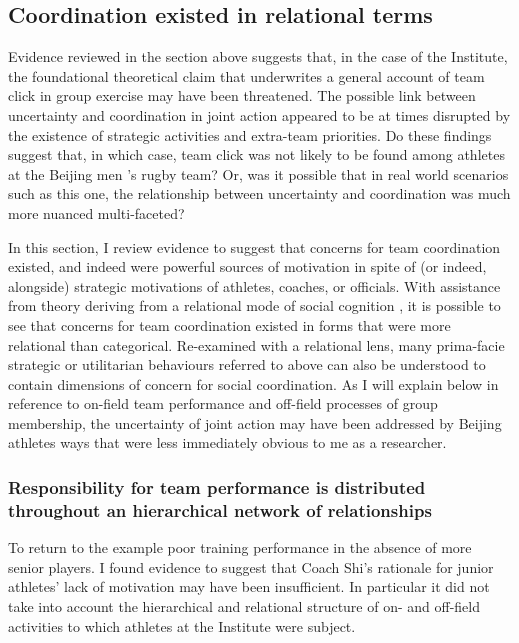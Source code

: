\begin{CJK}{UTF8}{gbsn}
\subsection{Coordination existed in relational terms}
Evidence reviewed in the section above suggests that, in the case of the Institute, the foundational theoretical claim that underwrites a general account of team click in group exercise may have been threatened.  The possible link between uncertainty and coordination in joint action appeared to be at times disrupted by the existence of strategic activities and extra-team priorities.  Do these findings suggest that, in which case, team click was not likely to be found among athletes at the Beijing men 's rugby team? Or, was it possible that in real world scenarios such as this one, the relationship between uncertainty and coordination was much more nuanced multi-faceted?

In this section, I review evidence to suggest that concerns for team coordination existed, and indeed were powerful sources of motivation in spite of (or indeed, alongside) strategic motivations of athletes, coaches, or officials.  With assistance from theory deriving from a relational mode of social cognition \citep{Liu2009}, it is possible to see that concerns for team coordination existed in forms that were more relational than categorical.  Re-examined with a relational lens, many prima-facie strategic or utilitarian behaviours referred to above can also be understood to contain dimensions of concern for social coordination.  As I will explain below in reference to on-field team performance and off-field processes of group membership, the uncertainty of joint action may have been addressed by Beijing athletes ways that were less immediately obvious to me as a researcher.


\subsubsection{Responsibility for team performance is distributed throughout an hierarchical network of relationships}
To return to the example poor training performance in the absence of more senior players. I found evidence to suggest that Coach Shi's rationale for junior athletes' lack of motivation may have been insufficient.  In particular it did not take into account the hierarchical and relational structure of on- and off-field activities to which athletes at the Institute were subject.


\end{CJK}
